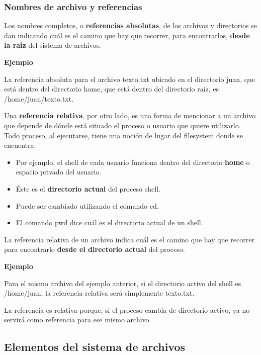 \documentclass[spanish,A4,]{article}
\begin{document}
\subsubsection{Nombres de archivo y
referencias}\label{nombres-de-archivo-y-referencias}

Los nombres completos, o \textbf{referencias absolutas}, de los archivos
y directorios se dan indicando cuál es el camino que hay que recorrer,
para encontrarlos, \textbf{desde la raíz} del sistema de archivos.

\textbf{Ejemplo}

La referencia absoluta para el archivo texto.txt ubicado en el
directorio juan, que está dentro del directorio home, que está dentro
del directorio raíz, es /home/juan/texto.txt.

Una \textbf{referencia relativa}, por otro lado, es una forma de
mencionar a un archivo que depende de dónde está situado el proceso o
usuario que quiere utilizarlo. Todo proceso, al ejecutarse, tiene una
noción de lugar del filesystem donde se encuentra.

\begin{itemize}
\itemsep1pt\parskip0pt
\item
  Por ejemplo, el shell de cada usuario funciona dentro del directorio
  \textbf{home} o espacio privado del usuario.
\item
  Éste es el \textbf{directorio actual} del proceso shell.
\item
  Puede ser cambiado utilizando el comando cd.
\item
  El comando pwd dice cuál es el directorio actual de un shell.
\end{itemize}

La referencia relativa de un archivo indica cuál es el camino que hay
que recorrer para encontrarlo \textbf{desde el directorio actual} del
proceso.

\textbf{Ejemplo}

Para el mismo archivo del ejemplo anterior, si el directorio activo del
shell es /home/juan, la referencia relativa será simplemente texto.txt.

La referencia es relativa porque, si el proceso cambia de directorio
activo, ya no servirá como referencia para ese mismo archivo.

\subsection{Elementos del sistema de
archivos}\label{elementos-del-sistema-de-archivos}
\end{document}
